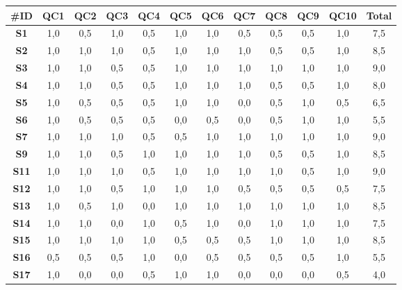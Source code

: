 \begin{table}
    \centering
    \scriptsize
    
    \setlength\tabcolsep{2pt}
    \def\arraystretch{1.4}%
    \begin{tabular}{|c|c|c|c|c|c|c|c|c|c|c||c|} 
    
    \hline
    \textbf{\#ID} & \textbf{QC1} & \textbf{QC2} & \textbf{QC3} & \textbf{QC4} & \textbf{QC5} & \textbf{QC6} & \textbf{QC7} & \textbf{QC8} & \textbf{QC9} & \textbf{QC10} & \textbf{Total} \\
    \hline
    
    \textbf{S1} & 1,0 & 0,5 & 1,0 & 0,5 & 1,0 & 1,0 & 0,5 & 0,5 & 0,5 & 1,0 & 7,5 \\ \hline
    \textbf{S2} & 1,0 & 1,0 & 1,0 & 0,5 & 1,0 & 1,0 & 1,0 & 0,5 & 0,5 & 1,0 & 8,5 \\ \hline
    \textbf{S3} & 1,0 & 1,0 & 0,5 & 0,5 & 1,0 & 1,0 & 1,0 & 1,0 & 1,0 & 1,0 & 9,0 \\ \hline
    \textbf{S4} & 1,0 & 1,0 & 0,5 & 0,5 & 1,0 & 1,0 & 1,0 & 0,5 & 0,5 & 1,0 & 8,0 \\ \hline
    \textbf{S5} & 1,0 & 0,5 & 0,5 & 0,5 & 1,0 & 1,0 & 0,0 & 0,5 & 1,0 & 0,5 & 6,5 \\ \hline
    \textbf{S6} & 1,0 & 0,5 & 0,5 & 0,5 & 0,0 & 0,5 & 0,0 & 0,5 & 1,0 & 1,0 & 5,5 \\ \hline
    \textbf{S7} & 1,0 & 1,0 & 1,0 & 0,5 & 0,5 & 1,0 & 1,0 & 1,0 & 1,0 & 1,0 & 9,0 \\ \hline
    \textbf{S9} & 1,0 & 1,0 & 0,5 & 1,0 & 1,0 & 1,0 & 1,0 & 0,5 & 0,5 & 1,0 & 8,5 \\ \hline
    \textbf{S11} & 1,0 & 1,0 & 1,0 & 0,5 & 1,0 & 1,0 & 1,0 & 1,0 & 0,5 & 1,0 & 9,0 \\ \hline
    \textbf{S12} & 1,0 & 1,0 & 0,5 & 1,0 & 1,0 & 1,0 & 0,5 & 0,5 & 0,5 & 0,5 & 7,5 \\ \hline
    \textbf{S13} & 1,0 & 0,5 & 1,0 & 0,0 & 1,0 & 1,0 & 1,0 & 1,0 & 1,0 & 1,0 & 8,5 \\ \hline
    \textbf{S14} & 1,0 & 1,0 & 0,0 & 1,0 & 0,5 & 1,0 & 0,0 & 1,0 & 1,0 & 1,0 & 7,5 \\ \hline
    \textbf{S15} & 1,0 & 1,0 & 1,0 & 1,0 & 0,5 & 0,5 & 0,5 & 1,0 & 1,0 & 1,0 & 8,5 \\ \hline
    \textbf{S16} & 0,5 & 0,5 & 0,5 & 1,0 & 0,0 & 0,5 & 0,5 & 0,5 & 0,5 & 1,0 & 5,5 \\ \hline
    \textbf{S17} & 1,0 & 0,0 & 0,0 & 0,5 & 1,0 & 1,0 & 0,0 & 0,0 & 0,0 & 0,5 & 4,0 \\ \hline

\end{tabular}
\end{table}
